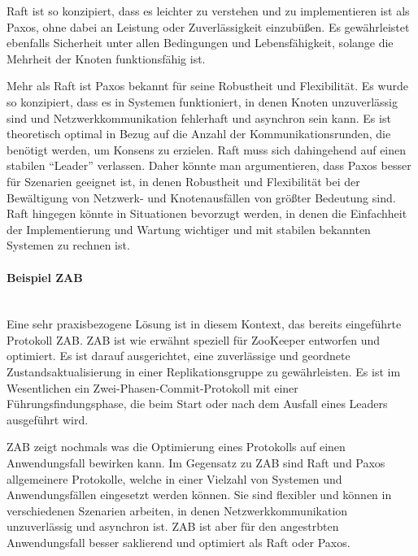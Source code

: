 Raft ist so konzipiert, dass es leichter zu verstehen und zu implementieren ist als Paxos, ohne dabei an Leistung oder Zuverlässigkeit einzubüßen. Es gewährleistet ebenfalls Sicherheit unter allen Bedingungen und Lebensfähigkeit, solange die Mehrheit der Knoten funktionsfähig ist.

Mehr als Raft ist Paxos bekannt für seine Robustheit und Flexibilität. Es wurde so konzipiert, dass es in Systemen funktioniert, in denen Knoten unzuverlässig sind und Netzwerkkommunikation fehlerhaft und asynchron sein kann. Es ist theoretisch optimal in Bezug auf die Anzahl der Kommunikationsrunden, die benötigt werden, um Konsens zu erzielen. Raft muss sich dahingehend auf einen stabilen \enquote{Leader} verlassen. 
Daher könnte man argumentieren, dass Paxos besser für Szenarien geeignet ist, in denen Robustheit und Flexibilität bei der Bewältigung von Netzwerk- und Knotenausfällen von größter Bedeutung sind. Raft hingegen könnte in Situationen bevorzugt werden, in denen die Einfachheit der Implementierung und Wartung wichtiger und mit stabilen bekannten Systemen zu rechnen ist.
\paragraph{Beispiel ZAB}\mbox{}\\
Eine sehr praxisbezogene Lösung ist in diesem Kontext, das bereits eingeführte Protokoll ZAB. ZAB ist wie erwähnt speziell für ZooKeeper entworfen und optimiert. Es ist darauf ausgerichtet, eine zuverlässige und geordnete Zustandsaktualisierung in einer Replikationsgruppe zu gewährleisten. Es ist im Wesentlichen ein Zwei-Phasen-Commit-Protokoll mit einer Führungsfindungsphase, die beim Start oder nach dem Ausfall eines Leaders ausgeführt wird.

ZAB zeigt nochmals was die Optimierung eines Protokolls auf einen Anwendungsfall bewirken kann. Im Gegensatz zu ZAB sind Raft und Paxos allgemeinere Protokolle, welche in einer Vielzahl von Systemen und Anwendungsfällen eingesetzt werden können. Sie sind flexibler und können in verschiedenen Szenarien arbeiten, in denen Netzwerkkommunikation unzuverlässig und asynchron ist. ZAB ist aber für den angestrbten Anwendungsfall besser saklierend und optimiert als Raft oder Paxos.

